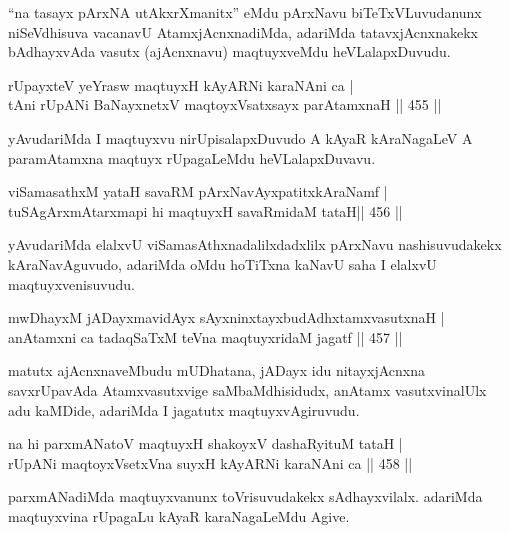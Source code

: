 \begin{artha}
``na tasayx pArxNA utAkxrXmanitx'' eMdu pArxNavu biTeTxVLuvudanunx niSeVdhisuva vacanavU AtamxjAcnxnadiMda, adariMda tatavxjAcnxnakekx bAdhayxvAda vasutx (ajAcnxnavu) maqtuyxveMdu heVLalapxDuvudu.
\end{artha}


\begin{shl}
rUpayxteV yeYrasw maqtuyxH kAyARNi karaNAni ca | \\
tAni rUpANi BaNayxnetxV maqtoyxVsatxsayx parAtamxnaH \hfill||  455 || 
\end{shl}

\begin{artha}
yAvudariMda I maqtuyxvu nirUpisalapxDuvudo A kAyaR kAraNagaLeV A paramAtamxna maqtuyx rUpagaLeMdu heVLalapxDuvavu.
\end{artha}

\begin{shl}
viSamasathxM yataH savaRM pArxNavAyxpatitxkAraNamf | \\
tuSAgArxmAtarxmapi hi maqtuyxH savaRmidaM tataH\hfill ||  456 ||  
\end{shl}

\begin{artha}
yAvudariMda elalxvU viSamasAthxnadalilxdadxlilx pArxNavu nashisuvudakekx kAraNavAguvudo, adariMda oMdu hoTiTxna kaNavU saha I elalxvU maqtuyxvenisuvudu.
\end{artha}

\begin{shl}
mwDhayxM jADayxmavidAyx sAyxninxtayxbudAdhxtamxvasutxnaH | \\
anAtamxni ca tadaqSaTxM teVna maqtuyxridaM jagatf \hfill||  457 || 
\end{shl}

\begin{artha}
matutx ajAcnxnaveMbudu mUDhatana, jADayx idu nitayxjAcnxna savxrUpavAda Atamxvasutxvige saMbaMdhisidudx, anAtamx vasutxvinalUlx adu kaMDide, adariMda I jagatutx maqtuyxvAgiruvudu.
\end{artha}

\begin{shl}
na hi parxmANatoV maqtuyxH shakoyxV dashaRyituM tataH | \\
rUpANi maqtoyxVsetxVna suyxH kAyARNi karaNAni ca \hfill||  458 ||  
\end{shl}

\begin{artha}
parxmANadiMda maqtuyxvanunx toVrisuvudakekx sAdhayxvilalx. adariMda maqtuyxvina rUpagaLu kAyaR karaNagaLeMdu Agive.
\end{artha}

